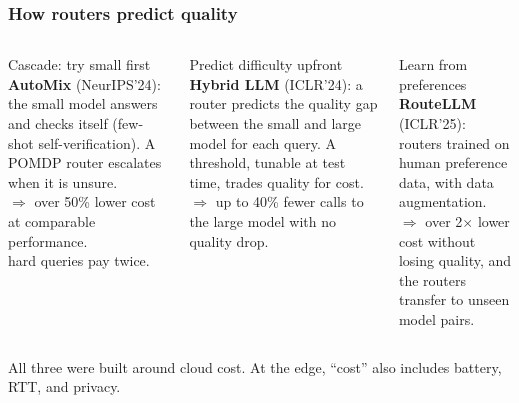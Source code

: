 \begin{frame}
\frametitle{How routers predict quality}
\small
\begin{columns}[T]
\begin{block}{Cascade: try small first}
\textbf{AutoMix} (NeurIPS'24): the small model answers and checks itself (few-shot self-verification). A POMDP router escalates when it is unsure.\\[2pt]
$\Rightarrow$ over 50\% lower cost at comparable performance.\\[2pt]
\con hard queries pay twice.
\end{block}
\begin{block}{Predict difficulty upfront}
\textbf{Hybrid LLM} (ICLR'24): a router predicts the quality gap between the small and large model for each query. A threshold, tunable at test time, trades quality for cost.\\[2pt]
$\Rightarrow$ up to 40\% fewer calls to the large model with no quality drop.
\end{block}
\begin{block}{Learn from preferences}
\textbf{RouteLLM} (ICLR'25): routers trained on human preference data, with data augmentation.\\[2pt]
$\Rightarrow$ over 2$\times$ lower cost without losing quality, and the routers transfer to unseen model pairs.
\end{block}
\end{columns}
\vspace{6pt}
All three were built around cloud cost. At the edge, ``cost'' also includes battery, RTT, and privacy.
\end{frame}

